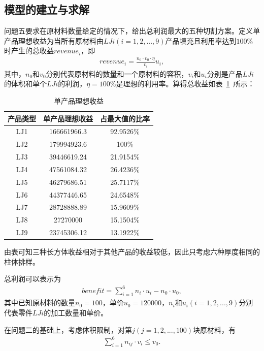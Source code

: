 \documentclass{whutmod}
\begin{document}
  	\subsection{模型的建立与求解}
  	问题五要求在原材料数量给定的情况下，给出总利润最大的五种切割方案。定义单产品理想收益为当所有原材料由$LJi(i=1,2,...,9)$产品填充且利用率达到$100\%$时产生的总收益$revenue_i$，即
  	\begin{gather}
	revenue_i=\frac{n_0\cdot v_0\cdot \eta }{v_i}u_i,
  	\end{gather}
  	其中，$n_0$和$v_0$分别代表原材料的数量和一个原材料的容积，$v_i$和$u_i$分别是产品$LJi$的体积和单个$LJi$的利润，$\eta=100\%$是理想的利用率。算得总收益如表~\ref{danchan}~所示：
  	
  	\begin{table}[H]
  		\centering		
  		\caption{单产品理想收益}\label{danchan}
  		\begin{tabular}{ccc}
  			\toprule[2pt]
  			\multicolumn{1}{m{2cm}}{\centering 产品类型}
  			& \multicolumn{1}{m{4cm}}{\centering 单产品理想收益}
  			& \multicolumn{1}{m{5cm}}{\centering 占最大值的比率}
  			\\
  			\midrule[1pt]
  			LJ1 &  166661966.3&92.9526\%\\ 
  			LJ2 &  179994923.6&100\%\\ 
  			LJ3 &  39446619.24&21.9154\%\\ 
  			LJ4 &  47561084.32&26.4236\%\\ 
  			LJ5 &  46279686.51&25.7117\%\\ 
  			LJ6 &  44377446.65&24.6548\%\\ 
  			LJ7 &  28728888.89&15.9609\%\\ 
  			LJ8 &  27270000&15.1504\%\\ 
  			LJ9 &  23745306.12&13.1922\%\\ 
  			\bottomrule[2pt]	
  		\end{tabular}
  	\end{table}
  	由表可知三种长方体收益相对于其他产品的收益较低，因此只考虑六种厚度相同的柱体排样。

  	总利润可以表示为
  	\begin{gather}
  	benefit=\sum_{i=1}^{6}n_i \cdot u_i-n_0\cdot u_0,
  	\end{gather}
	其中已知原材料的数量$n_0=100$，单价$u_0=120000$，$n_i$和$u_i(i=1,2,...,9)$分别代表零件$LJi$的加工数量和单价。

  	在问题二的基础上，考虑体积限制，对第$j(j=1,2,...,100)$块原材料，有
  	\begin{gather}
  	\sum_{i=1}^{6}n_{ij} \cdot v_i\leq v_0.
  	\end{gather}
  	
\end{document}
